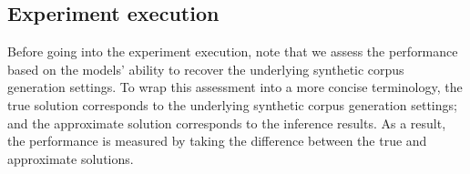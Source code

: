\documentclass{mpaper}
\begin{document}
\subsection{Experiment execution}


\par Before going into the experiment execution, note that we assess the performance based on the models' ability to recover the underlying synthetic corpus generation settings. To wrap this assessment into a more concise terminology, the true solution corresponds to the underlying synthetic corpus generation settings; and the approximate solution corresponds to the inference results. As a result, the performance is measured by taking the difference between the true and approximate solutions. 
\end{document}
